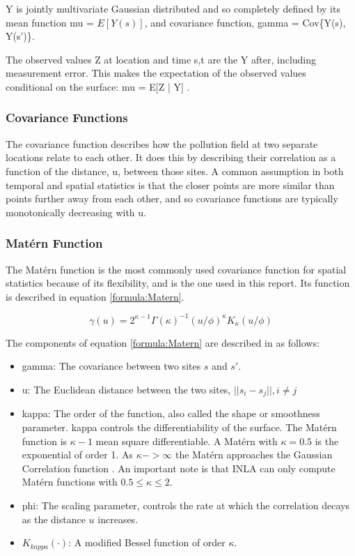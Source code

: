 \gls{Y} is jointly multivariate Gaussian distributed and so completely defined by its mean function \gls{mu} = $E[Y(s)]$, and covariance function, \gls{gamma} = 
Cov\{Y(s), Y(s')\}.

The observed values 
\gls{Z} at location and time \gls{s,t} are the \gls{Y} after, including measurement error.  This makes the expectation of the observed values conditional on the surface:
\gls{mu} = 
E[\gls{Z} | \gls{Y}] 
\citep{diggle:07}.

\subsubsection*{Covariance Functions}
\label{subsubsec:covariances}
The covariance function describes how the pollution field at two separate locations relate to each other. It does this by describing their correlation as a function of the distance, \gls{u}, between those sites.  A common assumption in both temporal and spatial statistics is that the closer points are more similar than points further away from each other, and so covariance functions are typically monotonically decreasing with \gls{u}.

\subsubsection*{Mat\'{e}rn Function} \label{subsubsec:MaternIntro}
The Mat\'{e}rn function is the most commonly used covariance function for spatial statistics because of its flexibility, \citep{diggle:07} and is the one used in this report.  Its function is described in equation \ref{formula:Matern}.

\begin{equation}  \label{formula:Matern}
	\gamma(u) = {2^{\kappa -1}\Gamma(\kappa)^{-1}(u/\phi)^{\kappa}K_{\kappa}(u/\phi)}
\end{equation}

The components of equation \ref{formula:Matern} are described in \cite{diggle:07} as follows:
\begin{itemize}
	\item \gls{gamma}:  The covariance between two sites $s$ and $s'$.
	\item \gls{u}: The Euclidean distance between the two sites,  $||s_i - s_j||, i \neq j$
	\item \gls{kappa}: The order of the function, also called the shape or smoothness parameter.  \gls{kappa} controls the differentiability of the surface.  The Mat\'{e}rn function is $\kappa -1$ mean square differentiable.  A Mat\'{e}rn with $\kappa = 0.5$ is the exponential of order 1.  As $\kappa -> \infty$  the Mat\'{e}rn approaches the Gaussian Correlation function  \cite{diggle:07}.  An important note is that INLA can only compute Mat\'{e}rn functions with $0.5 \leq \kappa \leq 2$.
	\item \gls{phi}: The scaling parameter, controls the rate at which the correlation decays as the distance $u$ increases.
	\item $K_{kappa}(\cdot)$: A modified Bessel function of order $\kappa$.
\end{itemize} 

